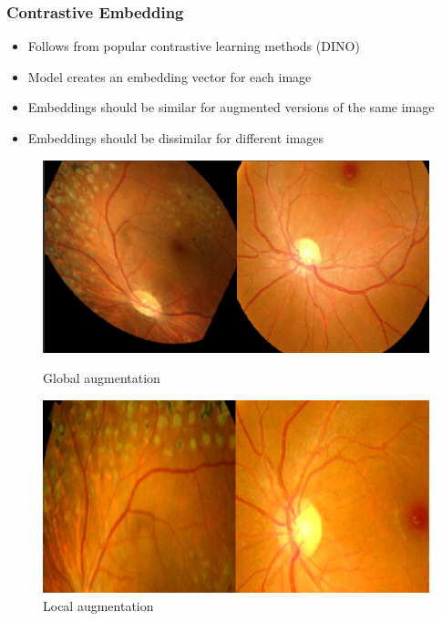 \documentclass{beamer}
\begin{document}
\begin{frame}
   \frametitle{Contrastive Embedding}
   \begin{itemize}
        \item Follows from popular contrastive learning methods (DINO) \cite{caron2021emerging}
        \item Model creates an embedding vector for each image
        \item Embeddings should be similar for augmented versions of the same image
        \item Embeddings should be dissimilar for different images
   \end{itemize}
   \begin{figure}
       \centering
       \begin{minipage}{0.45\textwidth}
           \centering
           \includegraphics[width=\textwidth]{contrastive_example1.png}
           \caption{Global augmentation}
       \end{minipage}\hfill
       \begin{minipage}{0.45\textwidth}
           \centering
           \includegraphics[width=\textwidth]{contrastive_example2.png}
           \caption{Local augmentation}
       \end{minipage}
   \end{figure}
\end{frame}
\end{document}
